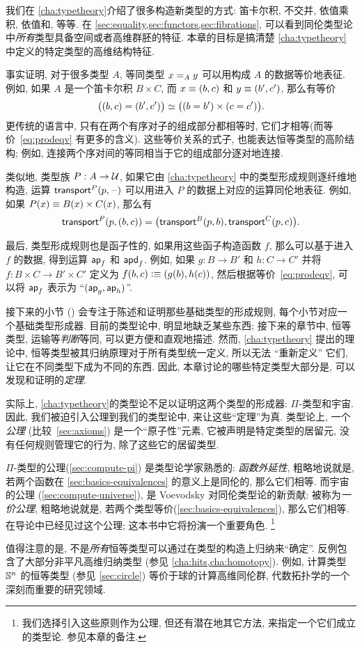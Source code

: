 我们在 \cref{cha:typetheory}介绍了很多构造新类型的方式: 笛卡尔积, 不交并, 依值乘积, 依值和, 等等.
在 \cref{sec:equality,sec:functors,sec:fibrations}, 可以看到同伦类型论中\emph{所有}类型具备空间或者高维群胚的特征.
本章的目标是搞清楚 \cref{cha:typetheory} 中定义的特定类型的高维结构特征.

事实证明, 对于很多类型 $A$, 等同类型 $\id[A]xy$ 可以用构成 $A$ 的数据等价地表征.
例如, 如果 $A$ 是一个笛卡尔积 $B\times C$, 而 $x\jdeq (b,c)$ 和 $y\jdeq(b',c')$, 那么有等价
\begin{equation}\label{eq:prodeqv}
  \eqv{\big((b,c)=(b',c')\big)}{\big((b=b')\times (c=c')\big)}.
\end{equation}
更传统的语言中, 只有在两个有序对子的组成部分都相等时, 它们才相等(而等价~\eqref{eq:prodeqv} 有更多的含义).
这些等价关系的式子, 也能表达恒等类型的高阶结构;
例如, 连接两个序对间的等同相当于它的组成部分逐对地连接.

类似地, 类型族 $P:A\to\type$, 如果它由 \cref{cha:typetheory} 中的类型形成规则逐纤维地构造, 运算 $\transfib{P}{p}{\blank}$ 可以用进入 $P$ 的数据上对应的运算同伦地表征.
例如, 如果 $P(x) \jdeq B(x)\times C(x)$, 那么有
\[\transfib{P}{p}{(b,c)} = \big(\transfib{B}{p}{b},\transfib{C}{p}{c}\big).\]

最后, 类型形成规则也是函子性的, 如果用这些函子构造函数 $f$, 那么可以基于进入 $f$ 的数据, 得到运算 $\apfunc f$ 和 $\apdfunc f$.
例如, 如果 $g:B\to B'$ 和 $h:C\to C'$ 并将 $f:B\times C \to B'\times C'$ 定义为 $f(b,c)\defeq (g(b),h(c))$, 然后根据等价~\eqref{eq:prodeqv}, 可以将 $\apfunc f$ 表示为 ``$(\apfunc g,\apfunc h)$''.

接下来的小节 () 会专注于陈述和证明那些基础类型的形成规则, 每个小节对应一个基础类型形成器.
目前的类型论中, 明显地缺乏某些东西;
接下来的章节中, 恒等类型, 运输等\emph{判断}等同, 可以更方便和直观地描述.
然而, \cref{cha:typetheory} 提出的理论中, 恒等类型被其归纳原理对于所有类型统一定义, 所以无法 ``重新定义'' 它们, 让它在不同类型下成为不同的东西.
因此, 本章讨论的哪些特定类型大部分是, 可以发现和证明的\emph{定理}.

实际上, \cref{cha:typetheory}的类型论不足以证明这两个类型的形成器: $\Pi$-类型和宇宙.
因此, 我们被迫引入公理到我们的类型论中, 来让这些``定理''为真.
类型论上, 一个\emph{公理} (比较~\cref{sec:axioms}) 是一个``原子性''元素, 它被声明是特定类型的居留元, 没有任何规则管理它的行为, 除了这些它的居留类型.
%

%
%
$\Pi$-类型的公理(\cref{sec:compute-pi}) 是类型论学家熟悉的: \emph{函数外延性}, 粗略地说就是, 若两个函数在 \cref{sec:basics-equivalences} 的意义上是同伦的, 那么它们相等.
而宇宙的公理 (\cref{sec:compute-universe}), 是 Voevodsky 对同伦类型论的新贡献: 被称为\emph{一价公理}, 粗略地说就是, 若两个类型等价(\cref{sec:basics-equivalences}), 那么它们相等.
在导论中已经见过这个公理; 这本书中它将扮演一个重要角色.%
\footnote{我们选择引入这些原则作为公理, 但还有潜在地其它方法, 来指定一个它们成立的类型论.
  参见本章的备注.}

值得注意的是, 不是\emph{所有}恒等类型可以通过在类型的构造上归纳来``确定''.
反例包含了大部分非平凡高维归纳类型 (参见 \cref{cha:hits,cha:homotopy}).
例如, 计算类型 $\Sn^n$ 的恒等类型 (参见 \cref{sec:circle}) 等价于球的计算高维同伦群, 代数拓扑学的一个深刻而重要的研究领域.